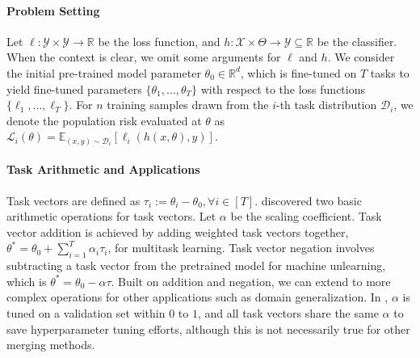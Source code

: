 \paragraph{Problem Setting}
Let $\ell : \mathcal{Y} \times \mathcal{Y} \to \mathbb{R}$ be the loss function, and $h : \mathcal{X} \times \Theta \to \mathcal{Y} \subseteq \mathbb{R}$ be the classifier. When the context is clear, we omit some arguments for $\ell$ and $h$. We consider the initial pre-trained model parameter $\theta_0 \in \mathbb{R}^d$, which is fine-tuned on $T$ tasks to yield fine-tuned parameters $\{ \theta_1, \dots, \theta_T \}$ with respect to the loss functions $\{ \ell_1, \dots, \ell_T \}$. For $n$ training samples drawn from the $i$-th task distribution $\mathcal{D}_i$, we denote the population risk evaluated at $\theta$ as $\mathcal{L}_i(\theta) = \mathbb{E}_{(x,y)\sim\mathcal{D}_i}[\ell_i(h(x, \theta),y)]$.

\paragraph{Task Arithmetic and Applications}
Task vectors are defined as $\tau_i := \theta_i - \theta_0, \forall i \in[T]$. \citet{ilharco2022editing} discovered two basic arithmetic operations for task vectors. Let $\alpha$ be the scaling coefficient. Task vector addition is achieved by adding weighted task vectors together, $\theta^* = \theta_0 + \sum_{i=1}^T \alpha_i \tau_i$, for multitask learning. Task vector negation involves subtracting a task vector from the pretrained model for machine unlearning, which is $\theta^* = \theta_0 - \alpha \tau$. Built on addition and negation, we can extend to more complex operations for other applications such as domain generalization. In \citet{ilharco2022editing}, $\alpha$ is tuned on a validation set within $0$ to $1$, and all task vectors share the same $\alpha$ to save hyperparameter tuning efforts, although this is not necessarily true for other merging methods. 